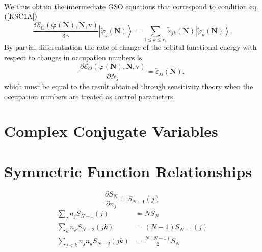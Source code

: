 \documentclass[aps,preprint]{revtex4}%
\begin{document}
We thus obtain the intermediate GSO equations that correspond to condition eq.
$\left(  \ref{KSC1A}\right)  $
\begin{equation}
\frac{\delta\mathcal{E}_{O}\left(  \boldsymbol{\tilde{\varphi}}\left(
\boldsymbol{N}\right)  ,\boldsymbol{N,}\mathrm{v}\right)  }{\delta\gamma
}\left\vert \tilde{\varphi}_{j}\left(  \boldsymbol{N}\right)  \right\rangle
=\sum_{1\leq k\leq r_{1}}\tilde{\varepsilon}_{jk}\left(  \boldsymbol{N}%
\right)  \left\vert \tilde{\varphi}_{k}\left(  \boldsymbol{N}\right)
\right\rangle .
\end{equation}
By partial differentiation the rate of change of the orbital functional energy
with respect to changes in occupation numbers is
\begin{equation}
\frac{\partial\mathcal{E}_{O}\left(  \boldsymbol{\tilde{\varphi}}\left(
\boldsymbol{N}\right)  ,\boldsymbol{N,}\mathrm{v}\right)  }{\partial N_{j}%
}=\tilde{\varepsilon}_{jj}\left(  \boldsymbol{N}\right)  ,
\end{equation}
which must be equal to the result obtained through sensitivity theory when the
occupation numbers are treated as control parameters.

\section{Complex Conjugate Variables \label{ComplexConjugate}}

\section{Symmetric Function Relationships}%

\begin{equation}
\frac{\partial S_{N}}{\partial n_{j}}=S_{N-1}\left(  j\right)
\end{equation}%
\begin{align}
\sum_{j}n_{j}S_{N-1}\left(  j\right)   &  =NS_{N}\\
\sum_{k}n_{k}S_{N-2}\left(  jk\right)   &  =\left(  N-1\right)  S_{N-1}\left(
j\right) \\
\sum_{j<k}n_{j}n_{k}S_{N-2}\left(  jk\right)   &  =\frac{N\left(  N-1\right)
}{2}S_{N}%
\end{align}
\end{document}
